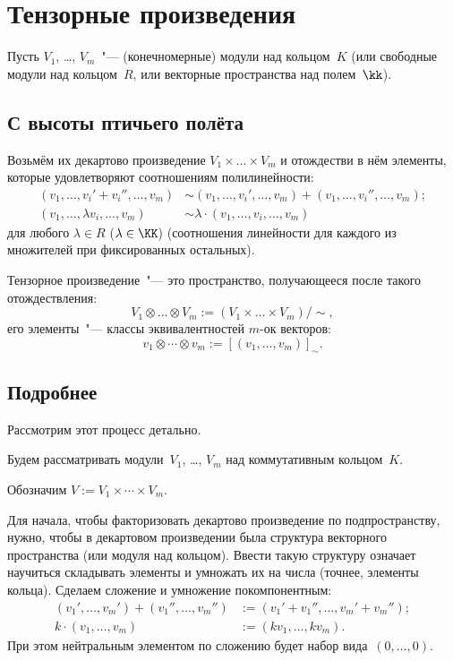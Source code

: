 \section{Тензорные произведения}


Пусть $V_1$, \dots, $V_m$~"--- (конечномерные) модули над кольцом~$K$ (или свободные модули над кольцом~$R$, или векторные пространства над полем~$\kk$).

\subsection{С высоты птичьего полёта}

Возьмём их декартово произведение $V_1 \times \dots \times V_m$ и отождестви в нём элементы, которые удовлетворяют соотношениям полилинейности:
\[
	\begin{aligned}
		(v_1, \dots, v_i' + v_i'', \dots, v_m)
		&\sim
		(v_1, \dots, v_i', \dots, v_m)
		+
		(v_1, \dots, v_i'', \dots, v_m)
		;
		\\
		(v_1, \dots, \lambda v_i, \dots, v_m)
		&\sim
		\lambda
		\cdot
		(v_1, \dots, v_i, \dots, v_m)
	\end{aligned}
\]
для любого $\lambda \in R$ ($\lambda \in \KK$) (соотношения линейности для каждого из множителей при фиксированных остальных).

Тензорное произведение~"--- это пространство, получающееся после такого отождествления:
\[
	V_1 \otimes \dots \otimes V_m
	:=
	(V_1 \times \dots \times V_m)/\sim
	,
\]
его элементы~"--- классы эквивалентностей $m$-ок векторов:
\[
	v_1 \otimes \cdots \otimes v_m := [(v_1, \dots, v_m)]_{\sim}.
\]

\subsection{Подробнее}

Рассмотрим этот процесс детально.

Будем рассматривать модули~$V_1$, \dots, $V_m$ над коммутативным кольцом~$K$.

Обозначим $V := V_1 \times \cdots \times V_m$.

Для начала, чтобы факторизовать декартово произведение по подпространству, нужно, чтобы в декартовом произведении была структура векторного пространства (или модуля над кольцом).
Ввести такую структуру означает научиться складывать элементы и умножать их на числа (точнее, элементы кольца). Сделаем сложение и умножение покомпонентным:
\begin{align*}
	(v_1', \dots, v_m') +
	(v_1'', \dots, v_m'') &:=
	(v_1' + v_1'', \dots, v_m' + v_m'')
	;
	\\
	k \cdot (v_1, \dots, v_m) &:=
	(kv_1, \dots, kv_m)
	.
\end{align*}
При этом нейтральным элементом по сложению будет набор вида~$(0, \dots, 0)$.

